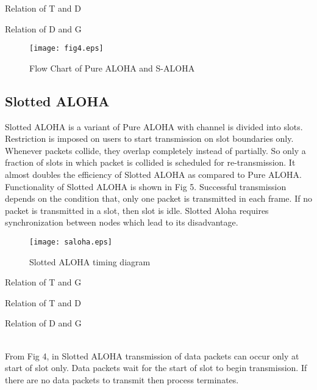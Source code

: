 \documentclass[11pt, conference, compsocconf, onecolumn]{IEEEtran}
\begin{document}
Relation of T and D

Relation of D and G

\begin{figure}[!h]
\centering
\caption{Flow Chart of Pure ALOHA and S-ALOHA}
\texttt{[image: fig4.eps]}
\end{figure}

\subsection{Slotted ALOHA}
Slotted ALOHA is a variant of Pure ALOHA with channel is divided into slots. Restriction is imposed on users to start transmission on slot boundaries only. Whenever packets collide, they overlap completely instead of partially. So only a fraction of slots in which packet is collided is scheduled for re-transmission. It almost doubles the efficiency of Slotted ALOHA as compared to Pure ALOHA.
Functionality of Slotted ALOHA is shown in Fig 5. Successful transmission depends on the condition that, only one packet is transmitted in each frame. If no packet is transmitted in a slot, then slot is idle. Slotted Aloha requires synchronization between nodes which lead to its disadvantage.
\begin{figure}[!h]
\centering
\caption{Slotted ALOHA timing diagram}
\texttt{[image: saloha.eps]}
\end{figure}
Relation of T and G

Relation of T and D

Relation of D and G

\\
\indent From Fig 4, in Slotted ALOHA transmission of data packets can occur only at start of slot only. Data packets wait for the start of slot to begin transmission.
If there are no data packets to transmit then process terminates.
\end{document}
